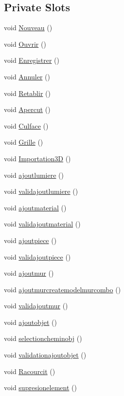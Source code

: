 \subsection*{Private Slots}
\begin{DoxyCompactItemize}
\item 
void \hyperlink{class_main_window_a6f837f331c40d27e47fbb0d6a73b040e}{Nouveau} ()
\item 
void \hyperlink{class_main_window_adbc60f34a13a49cc015dc4a124a588a1}{Ouvrir} ()
\item 
void \hyperlink{class_main_window_a8c07d91b87178ac0a1b88aabc45c6ddb}{Enregistrer} ()
\item 
void \hyperlink{class_main_window_a5277087cb1c0b01722b7a4ff436070ba}{Annuler} ()
\item 
void \hyperlink{class_main_window_ab2ff5da91852950471811fa93028dc0c}{Retablir} ()
\item 
void \hyperlink{class_main_window_a019328eaf07af3c9b8850e3db14fdf30}{Apercut} ()
\item 
void \hyperlink{class_main_window_a0b391dfd82e868b6f8badbc9717d6f49}{Culface} ()
\item 
void \hyperlink{class_main_window_a9a4d5849cf40a3ce50941e56cfa0be35}{Grille} ()
\item 
void \hyperlink{class_main_window_af26018b1d699cbf0a3f62048472cc489}{Importation3\+D} ()
\item 
void \hyperlink{class_main_window_a42d29fe9a2657a5c5563b3f1235a28e4}{ajoutlumiere} ()
\item 
void \hyperlink{class_main_window_a56f65a459f0caca9f71251663b200431}{validajoutlumiere} ()
\item 
void \hyperlink{class_main_window_a3a599353265f9c01a8780529aa5fed75}{ajoutmaterial} ()
\item 
void \hyperlink{class_main_window_a2d8cee622b78ccdeed758c51b9fb5b0e}{validajoutmaterial} ()
\item 
void \hyperlink{class_main_window_a6661770cd92877aa3b1c0dae91513a50}{ajoutpiece} ()
\item 
void \hyperlink{class_main_window_ada60d01c441123e1b7d4d30be1d16f8f}{validajoutpiece} ()
\item 
void \hyperlink{class_main_window_a3d19fc185c807148a627777459737754}{ajoutmur} ()
\item 
void \hyperlink{class_main_window_a282b0371fa087fba28044fd05f38301b}{ajoutmurcreatemodelmurcombo} ()
\item 
void \hyperlink{class_main_window_afcd72c860bccb97abd7af324fbc50f56}{validajoutmur} ()
\item 
void \hyperlink{class_main_window_a54645636f58b920914895b422a00ed85}{ajoutobjet} ()
\item 
void \hyperlink{class_main_window_a8ba990d0c3e19d63dbcff0328a85358b}{selectioncheminobj} ()
\item 
void \hyperlink{class_main_window_a8b07c3898c2bb70b8de0e4f339b1d6ed}{validationajoutobjet} ()
\item 
void \hyperlink{class_main_window_abd2acb261445354d2fd680c9b48bad77}{Racourcit} ()
\item 
void \hyperlink{class_main_window_a19a5bbb5908cda1ecfdf5ecd99ef0c4c}{supresionelement} ()
\end{DoxyCompactItemize}
